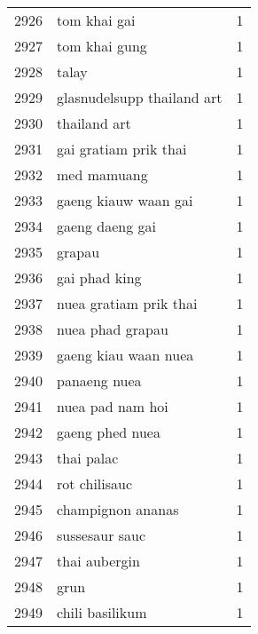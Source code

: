 \begin{tabular}{llr}
2926 &                                       tom khai gai &      1 \\
2927 &                                      tom khai gung &      1 \\
2928 &                                              talay &      1 \\
2929 &                         glasnudelsupp thailand art &      1 \\
2930 &                                       thailand art &      1 \\
2931 &                              gai gratiam prik thai &      1 \\
2932 &                                        med mamuang &      1 \\
2933 &                               gaeng kiauw waan gai &      1 \\
2934 &                                    gaeng daeng gai &      1 \\
2935 &                                             grapau &      1 \\
2936 &                                      gai phad king &      1 \\
2937 &                             nuea gratiam prik thai &      1 \\
2938 &                                   nuea phad grapau &      1 \\
2939 &                               gaeng kiau waan nuea &      1 \\
2940 &                                       panaeng nuea &      1 \\
2941 &                                   nuea pad nam hoi &      1 \\
2942 &                                    gaeng phed nuea &      1 \\
2943 &                                         thai palac &      1 \\
2944 &                                      rot chilisauc &      1 \\
2945 &                                  champignon ananas &      1 \\
2946 &                                     sussesaur sauc &      1 \\
2947 &                                      thai aubergin &      1 \\
2948 &                                               grun &      1 \\
2949 &                                    chili basilikum &      1 \\

\end{tabular}
